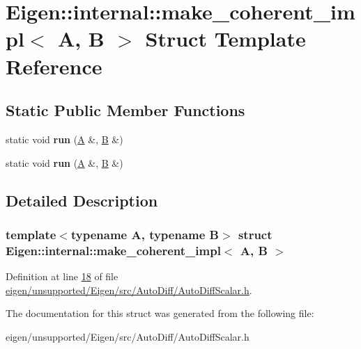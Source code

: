 \hypertarget{struct_eigen_1_1internal_1_1make__coherent__impl}{}\section{Eigen\+:\+:internal\+:\+:make\+\_\+coherent\+\_\+impl$<$ A, B $>$ Struct Template Reference}
\label{struct_eigen_1_1internal_1_1make__coherent__impl}
\subsection*{Static Public Member Functions}
\begin{DoxyCompactItemize}
\item 
\mbox{\label{struct_eigen_1_1internal_1_1make__coherent__impl_a1ab9909f24a2b569359f3baa6a38d1df}} 
static void {\bfseries run} (\hyperlink{group___core___module_class_eigen_1_1_matrix}{A} \&, \hyperlink{group___core___module_class_eigen_1_1_matrix}{B} \&)
\item 
\mbox{\label{struct_eigen_1_1internal_1_1make__coherent__impl_a1ab9909f24a2b569359f3baa6a38d1df}} 
static void {\bfseries run} (\hyperlink{group___core___module_class_eigen_1_1_matrix}{A} \&, \hyperlink{group___core___module_class_eigen_1_1_matrix}{B} \&)
\end{DoxyCompactItemize}


\subsection{Detailed Description}
\subsubsection*{template$<$typename A, typename B$>$\newline
struct Eigen\+::internal\+::make\+\_\+coherent\+\_\+impl$<$ A, B $>$}



Definition at line \hyperlink{eigen_2unsupported_2_eigen_2src_2_auto_diff_2_auto_diff_scalar_8h_source_l00018}{18} of file \hyperlink{eigen_2unsupported_2_eigen_2src_2_auto_diff_2_auto_diff_scalar_8h_source}{eigen/unsupported/\+Eigen/src/\+Auto\+Diff/\+Auto\+Diff\+Scalar.\+h}.



The documentation for this struct was generated from the following file\+:\begin{DoxyCompactItemize}
\item 
eigen/unsupported/\+Eigen/src/\+Auto\+Diff/\+Auto\+Diff\+Scalar.\+h\end{DoxyCompactItemize}
